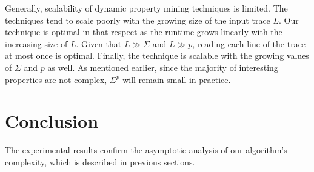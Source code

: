 \documentclass[]{sigplanconf}
\begin{document}

Generally, scalability of dynamic property mining techniques is limited.
The techniques tend to scale poorly with the growing size of the input trace $L$. Our technique is optimal in that respect as the runtime grows linearly with the increasing size of $L$. Given that $L \gg \Sigma$ and $L \gg p$, reading each line of the trace at most once is optimal.
Finally, the technique is scalable with the growing values of $\Sigma$ and $p$ as well. As mentioned earlier, since the majority of interesting properties are not complex, $\Sigma^p$ will remain small in practice.

\section{Conclusion}

The experimental results confirm the asymptotic analysis of our algorithm's complexity, which is described in previous sections.


%


\end{document}
